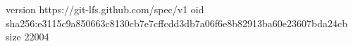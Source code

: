 version https://git-lfs.github.com/spec/v1
oid sha256:e3115c9a850663c8130cb7e7cffcdd3db7a06f6e8b82913ba60e23607bda24cb
size 22004
